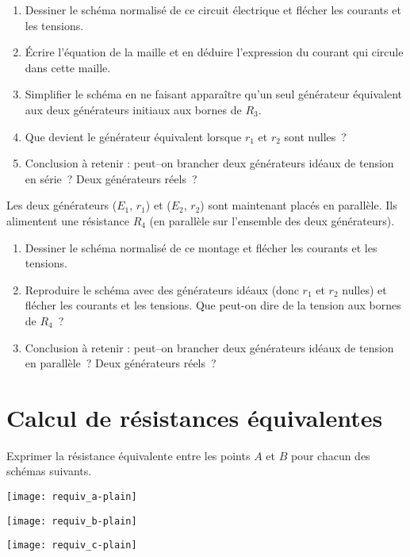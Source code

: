 \documentclass[a4paper, 12pt, final, garamond]{book}
\begin{document}
\begin{enumerate}
    \item Dessiner le schéma normalisé de ce circuit électrique et flécher les
        courants et les tensions.
    \item Écrire l'équation de la maille et en déduire l'expression du courant
        qui circule dans cette maille.
    \item Simplifier le schéma en ne faisant apparaître qu'un seul générateur
        équivalent aux deux générateurs initiaux aux bornes de $R_3$.
    \item Que devient le générateur équivalent lorsque $r_1$ et $r_2$ sont
        nulles~?
    \item Conclusion à retenir : peut–on brancher deux générateurs idéaux de
        tension en série~? Deux générateurs réels~?
\end{enumerate}
Les deux générateurs ($E_1$, $r_1$) et ($E_2$, $r_2$) sont maintenant placés en
parallèle. Ils alimentent une résistance $R_4$ (en parallèle sur l'ensemble des
deux générateurs).
\begin{enumerate}[resume]
    \item Dessiner le schéma normalisé de ce montage et flécher les courants et
        les tensions.
    \item Reproduire le schéma avec des générateurs idéaux (donc $r_1$ et $r_2$
        nulles) et flécher les courants et les tensions. Que peut-on dire de la
        tension aux bornes de $R_4$~?
    \item Conclusion à retenir : peut–on brancher deux générateurs idéaux de
        tension en parallèle~? Deux générateurs réels~?
\end{enumerate}

\section{Calcul de résistances équivalentes} Exprimer la résistance équivalente
entre les points $A$ et $B$ pour chacun des schémas suivants. \bigbreak

\begin{minipage}{0.32\linewidth}
    \begin{center}
        \texttt{[image: requiv\_a-plain]}
    \end{center}
\end{minipage}
\begin{minipage}{0.32\linewidth}
    \begin{center}
        \texttt{[image: requiv\_b-plain]}
    \end{center}
\end{minipage}
\begin{minipage}{0.32\linewidth}
    \begin{center}
        \texttt{[image: requiv\_c-plain]}
    \end{center}
\end{minipage}
\end{document}
